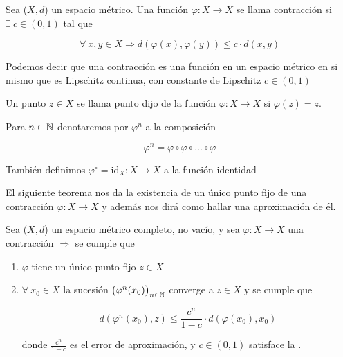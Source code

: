 \begin{definition}[Contracción] \label{def431}
    Sea ($X,d$) un espacio métrico. Una función $\varphi : X \to X$ se llama contracción si $\exists \: c \in (0,1)$ tal que

    $$\forall \: x, y \in X \Rightarrow d(\varphi(x), \varphi(y)) \leqslant c \cdot d(x,y)$$

    Podemos decir que una contracción es una función en un espacio métrico en si mismo que es Lipschitz continua, con constante de Lipschitz $c \in (0,1)$
\end{definition}

\begin{definition}
    Un punto $z \in X$ se llama punto dijo de la función $\varphi : X \to X$ si $\varphi(z) = z$. 
    
    Para $n \in \mathbb{N}$ denotaremos por $\varphi^n$ a la composición 

    $$\varphi^n = \varphi \circ \varphi \circ ... \circ \varphi$$

    También definimos $\varphi^\circ = \mathrm{id}_X : X \to X$ a la función identidad
\end{definition}

\begin{remark}
    El siguiente teorema nos da la existencia de un único punto fijo de una contracción $\varphi : X \to X$ y además nos dirá como hallar una aproximación de él.
\end{remark}

\begin{theorem} \label{theombanach}
    Sea ($X,d$) un espacio métrico completo, no vacío, y sea $\varphi : X \to X$ una contracción $\Rightarrow$ se cumple que

    \begin{enumerate}
        \item $\varphi$ tiene un único punto fijo $z \in X$
        \item $\forall \: x_0 \in X$ la sucesión ${\left( \varphi^n (x_0) \right)}_{n \in \mathbb{N}}$ converge a $z \in X$ y se cumple que

        $$d(\varphi^n(x_0),z) \leqslant \frac{c^n}{1-c} \cdot d(\varphi(x_0), x_0)$$

        donde $\frac{c^n}{1-c}$ es el error de aproximación, y $c \in (0,1)$ satisface la .
    \end{enumerate}
\end{theorem}

